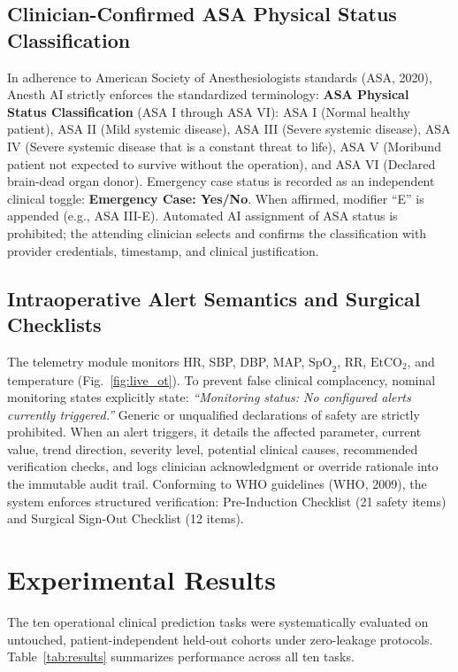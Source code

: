 \documentclass[conference]{IEEEtran}
\begin{document}
\subsection{Clinician-Confirmed ASA Physical Status Classification}
In adherence to American Society of Anesthesiologists standards (ASA, 2020), Anesth AI strictly enforces the standardized terminology: \textbf{ASA Physical Status Classification} (ASA I through ASA VI): ASA I (Normal healthy patient), ASA II (Mild systemic disease), ASA III (Severe systemic disease), ASA IV (Severe systemic disease that is a constant threat to life), ASA V (Moribund patient not expected to survive without the operation), and ASA VI (Declared brain-dead organ donor). Emergency case status is recorded as an independent clinical toggle: \textbf{Emergency Case: Yes/No}. When affirmed, modifier ``E'' is appended (e.g., ASA III-E). Automated AI assignment of ASA status is prohibited; the attending clinician selects and confirms the classification with provider credentials, timestamp, and clinical justification.

\subsection{Intraoperative Alert Semantics and Surgical Checklists}
The telemetry module monitors HR, SBP, DBP, MAP, $\text{SpO}_2$, RR, $\text{EtCO}_2$, and temperature (Fig.~\ref{fig:live_ot}). To prevent false clinical complacency, nominal monitoring states explicitly state: \textit{``Monitoring status: No configured alerts currently triggered.''} Generic or unqualified declarations of safety are strictly prohibited. When an alert triggers, it details the affected parameter, current value, trend direction, severity level, potential clinical causes, recommended verification checks, and logs clinician acknowledgment or override rationale into the immutable audit trail. Conforming to WHO guidelines (WHO, 2009), the system enforces structured verification: Pre-Induction Checklist (21 safety items) and Surgical Sign-Out Checklist (12 items).

\section{Experimental Results}
The ten operational clinical prediction tasks were systematically evaluated on untouched, patient-independent held-out cohorts under zero-leakage protocols. Table~\ref{tab:results} summarizes performance across all ten tasks.
\end{document}
